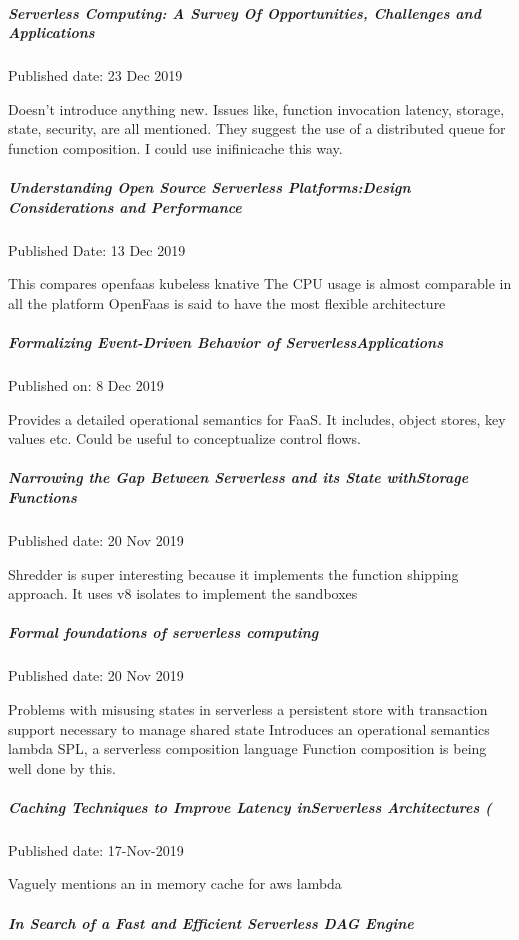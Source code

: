\documentclass[12pt,titlepage]{article}
\begin{document}
\subparagraph{Serverless Computing: A Survey Of Opportunities, Challenges and Applications}
\label{sec:orgd561397}

Published date: 23 Dec 2019

Doesn’t introduce anything new. Issues like, function invocation latency, storage, state, security, are all mentioned.
They suggest the use of a distributed queue for function composition. I could use inifinicache this way.

\subparagraph{Understanding Open Source Serverless Platforms:Design Considerations and Performance}
\label{sec:org04e7fe4}

Published Date: 13 Dec 2019

This compares openfaas kubeless knative
The CPU usage is almost comparable in all the platform
OpenFaas is said to have the most flexible architecture

\subparagraph{Formalizing Event-Driven Behavior of ServerlessApplications}
\label{sec:org0a741e2}

Published on: 8 Dec 2019

Provides a detailed operational semantics for FaaS. It includes, object stores, key values etc. Could be useful to conceptualize control flows.

\subparagraph{Narrowing the Gap Between Serverless and its State withStorage Functions}
\label{sec:orgeb93508}

Published date: 20 Nov 2019

Shredder is super interesting because it implements the function shipping approach.
It uses v8 isolates to implement the sandboxes

\subparagraph{Formal foundations of serverless computing}
\label{sec:orgb902c78}

Published date: 20 Nov 2019

Problems with misusing states in serverless
a persistent store with transaction support necessary to manage shared state
Introduces an operational semantics lambda
SPL, a serverless composition language
Function composition is being well done by this. 

\subparagraph{Caching Techniques to Improve Latency inServerless Architectures (}
\label{sec:org1af68a3}

Published date: 17-Nov-2019

Vaguely mentions an in memory cache for aws lambda

\subparagraph{In Search of a Fast and Efficient Serverless DAG Engine}
\label{sec:org6f6631a}
\end{document}
